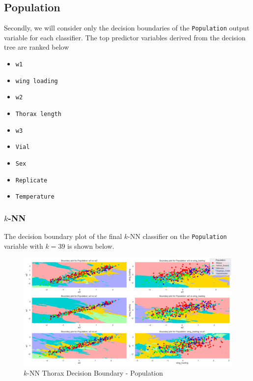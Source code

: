 \documentclass{article}
\begin{document}
\newpage
\subsection{Population}

Secondly, we will consider only the decision boundaries of the \texttt{Population} output variable for each classifier. The top predictor variables derived from the decision tree are ranked below

\begin{itemize}
    \item \texttt{w1}
    \item \texttt{wing loading}
    \item \texttt{w2}
    \item \texttt{Thorax length}
    \item \texttt{w3}
    \item \texttt{Vial}
    \item \texttt{Sex}
    \item \texttt{Replicate}
    \item \texttt{Temperature}
\end{itemize}


\subsubsection{$k$-NN}

The decision boundary plot of the final $k$-NN classifier on the \texttt{Population} variable with $k = 39$ is shown below.

\begin{figure}[htb]
    \centering
    \includegraphics[width=0.8\columnwidth]{plots/knn_Thorax_decision_boundaries_Population.png}
    \caption{$k$-NN Thorax Decision Boundary - Population}
    \label{fig:knn_thorax_db_pop}
\end{figure}
\end{document}
